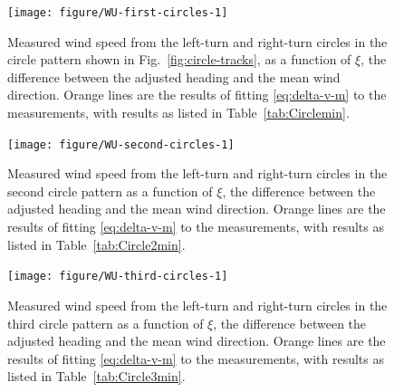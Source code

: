 \documentclass[12pt,twoside,english]{article}\usepackage[]{graphicx}\usepackage[]{color}
\newenvironment{knitrout}{}{} %
\begin{document}
\begin{knitrout}\footnotesize
{}\color{fgcolor}\begin{figure}

{\centering \texttt{[image: figure/WU-first-circles-1]} 

}

\caption[Measured wind speed from the left-turn and right-turn circles in the circle pattern shown in Fig.\ \ref{fig:circle-tracks}, as a function of the difference between the adjusted heading and the mean wind direction.]{Measured wind speed from the left-turn and right-turn circles in the circle pattern shown in Fig.\ \ref{fig:circle-tracks}, as a function of $\xi$, the difference between the adjusted heading and the mean wind direction. Orange lines are the results of fitting \eqref{eq:delta-v-m} to the measurements, with results as listed in Table~\ref{tab:Circlemin}.}\label{fig:first-circles}
\end{figure}


\end{knitrout}
\begin{knitrout}\footnotesize
{}\color{fgcolor}\begin{figure}

{\centering \texttt{[image: figure/WU-second-circles-1]} 

}

\caption[Measured wind speed from the left-turn and right-turn circles in the second circle pattern as a function of the difference between the adjusted heading and the mean wind direction.]{Measured wind speed from the left-turn and right-turn circles in the second circle pattern as a function of $\xi$, the difference between the adjusted heading and the mean wind direction. Orange lines are the results of fitting \eqref{eq:delta-v-m} to the measurements, with results as listed in Table~\ref{tab:Circle2min}.}\label{fig:second-circles}
\end{figure}


\end{knitrout}
\begin{knitrout}\footnotesize
{}\color{fgcolor}\begin{figure}

{\centering \texttt{[image: figure/WU-third-circles-1]} 

}

\caption[Measured wind speed from the left-turn and right-turn circles in the third circle pattern as a function of the difference between the adjusted heading and the mean wind direction.]{Measured wind speed from the left-turn and right-turn circles in the third circle pattern  as a function of $\xi$, the difference between the adjusted heading and the mean wind direction. Orange lines are the results of fitting \eqref{eq:delta-v-m} to the measurements, with results as listed in Table~\ref{tab:Circle3min}.}\label{fig:third-circles}
\end{figure}


\end{knitrout}
\end{document}
